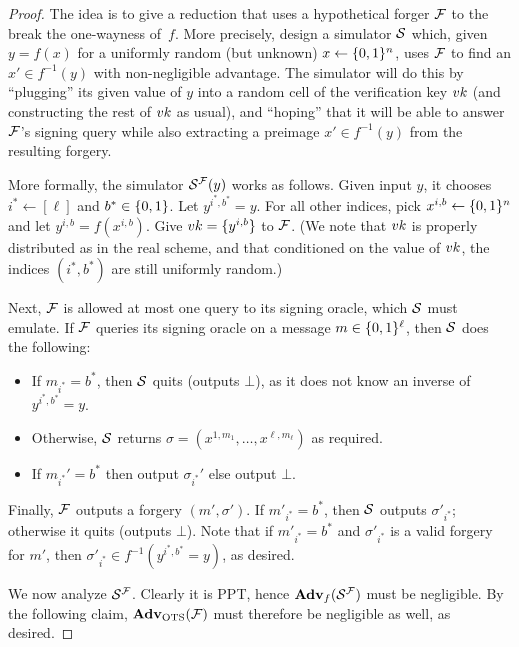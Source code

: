 \documentclass[11pt]{article}
\begin{document}
\begin{proof}
  The idea is to give a reduction that uses a hypothetical forger
  $\mathcal{F}$ to the break the one-wayness of~$f$.  More precisely, design
  a simulator $\mathcal{S}$ which, given $y = f(x)$ for a uniformly random
  (but unknown) $x \gets \{0,1\}^{n}$, uses $\mathcal{F}$ to find an $x' \in
  f^{-1}(y)$ with non-negligible advantage.  The simulator will do
  this by ``plugging'' its given value of $y$ into a random cell of
  the verification key $vk$ (and constructing the rest of $vk$ as
  usual), and ``hoping'' that it will be able to answer $\mathcal{F}$'s
  signing query while also extracting a preimage $x' \in f^{-1}(y)$
  from the resulting forgery.

  More formally, the simulator $\mathcal{S}^{\mathcal{F}}(y)$ works as follows.
  Given input $y$, it chooses $i^* \gets [\ell]$ and $b^* \in \{0,1\}$.
  Let $y^{i^*,b^*} = y$.  For all other indices, pick $x^{i,b} \gets
  \{0,1\}^n$ and let $y^{i,b} = f(x^{i,b})$.  Give $vk = \{y^{i,b}\}$
  to $\mathcal{F}$.  (We note that $vk$ is properly distributed as in the
  real scheme, and that conditioned on the value of $vk$, the indices
  $(i^*,b^*)$ are still uniformly random.)

  Next, $\mathcal{F}$ is allowed at most one query to its signing oracle,
  which $\mathcal{S}$ must emulate.  If $\mathcal{F}$ queries its signing oracle on
  a message $m \in \{0,1\}^{\ell}$, then $\mathcal{S}$ does the following:
  \begin{itemize}
  \item If $m_{i^*} = b^*$, then $\mathcal{S}$ quits (outputs $\bot$), as it
    does not know an inverse of $y^{i^{*},b^{*}} = y$.
  \item Otherwise, $\mathcal{S}$ returns $\sigma = (x^{1,m_{1}}, \ldots,
    x^{\ell,m_{\ell}})$ as required.
  \item If $m_{i^*}' = b^*$ then output $\sigma_{i^*}'$ else output
    $\bot$.
  \end{itemize}

  Finally, $\mathcal{F}$ outputs a forgery $(m', \sigma')$.  If $m'_{i^{*}} =
  b^{*}$, then $\mathcal{S}$ outputs $\sigma'_{i^{*}}$; otherwise it quits
  (outputs $\bot$).  Note that if $m'_{i^{*}} = b^{*}$ and
  $\sigma'_{i^*}$ is a valid forgery for $m'$, then $\sigma'_{i^{*}}
  \in f^{-1}(y^{i^*,b^*} = y)$, as desired.

  We now analyze $\mathcal{S}^{\mathcal{F}}$.  Clearly it is PPT, hence
  $\mathbf{Adv}_{f}(\mathcal{S}^{\mathcal{F}})$ must be negligible.  By the following
  claim, $\mathbf{Adv}_{\text{OTS}}(\mathcal{F})$ must therefore be negligible as well,
  as desired.


\end{proof}
\end{document}
